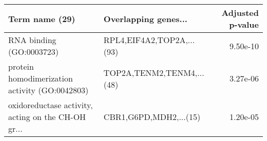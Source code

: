 \begin{tabular}{llr}
\toprule
                                    Term name (29) &      Overlapping genes... &  Adjusted p-value \\
\midrule
                          RNA binding (GO:0003723) & RPL4,EIF4A2,TOP2A,...(93) &          9.50e-10 \\
    protein homodimerization activity (GO:0042803) & TOP2A,TENM2,TENM4,...(48) &          3.27e-06 \\
oxidoreductase activity, acting on the CH-OH gr... &    CBR1,G6PD,MDH2,...(15) &          1.20e-05 \\
\bottomrule
\end{tabular}
